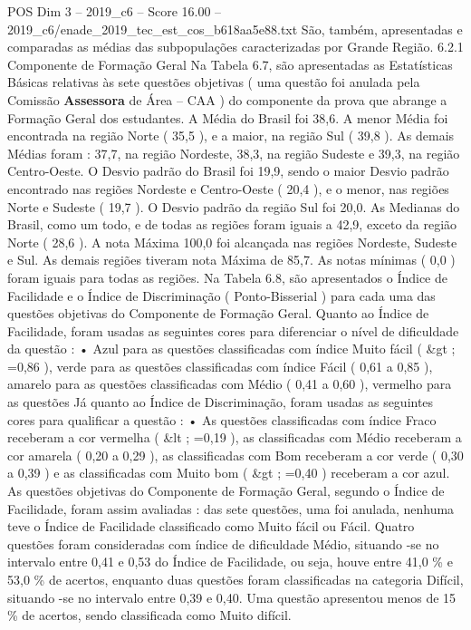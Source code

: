 \begin{textsample}{POS Dim 3 – 2019\_c6 – Score 16.00 – 2019\_c6/enade\_2019\_tec\_est\_cos\_b618aa5e88.txt}
São, também, apresentadas e comparadas as médias das subpopulações caracterizadas por Grande Região. 6.2.1 Componente de Formação Geral Na Tabela 6.7, são apresentadas as Estatísticas Básicas relativas às sete questões objetivas ( uma questão foi anulada pela Comissão \textbf{Assessora} de Área – CAA ) do componente da prova que abrange a Formação Geral dos estudantes.
A Média do Brasil foi 38,6.
A menor Média foi encontrada na região Norte ( 35,5 ), e a maior, na região Sul ( 39,8 ).
As demais Médias foram : 37,7, na região Nordeste, 38,3, na região Sudeste e 39,3, na região Centro-Oeste.
O Desvio padrão do Brasil foi 19,9, sendo o maior Desvio padrão encontrado nas regiões Nordeste e Centro-Oeste ( 20,4 ), e o menor, nas regiões Norte e Sudeste ( 19,7 ).
O Desvio padrão da região Sul foi 20,0.
As Medianas do Brasil, como um todo, e de todas as regiões foram iguais a 42,9, exceto da região Norte ( 28,6 ).
A nota Máxima 100,0 foi alcançada nas regiões Nordeste, Sudeste e Sul.
As demais regiões tiveram nota Máxima de 85,7.
As notas mínimas ( 0,0 ) foram iguais para todas as regiões.
Na Tabela 6.8, são apresentados o Índice de Facilidade e o Índice de Discriminação ( Ponto-Bisserial ) para cada uma das questões objetivas do Componente de Formação Geral.
Quanto ao Índice de Facilidade, foram usadas as seguintes cores para diferenciar o nível de dificuldade da questão : • Azul para as questões classificadas com índice Muito fácil ( \&gt ; =0,86 ), verde para as questões classificadas com índice Fácil ( 0,61 a 0,85 ), amarelo para as questões classificadas com Médio ( 0,41 a 0,60 ), vermelho para as questões Já quanto ao Índice de Discriminação, foram usadas as seguintes cores para qualificar a questão : • As questões classificadas com índice Fraco receberam a cor vermelha ( \&lt ; =0,19 ), as classificadas com Médio receberam a cor amarela ( 0,20 a 0,29 ), as classificadas com Bom receberam a cor verde ( 0,30 a 0,39 ) e as classificadas com Muito bom ( \&gt ; =0,40 ) receberam a cor azul.
As questões objetivas do Componente de Formação Geral, segundo o Índice de Facilidade, foram assim avaliadas : das sete questões, uma foi anulada, nenhuma teve o Índice de Facilidade classificado como Muito fácil ou Fácil.
Quatro questões foram consideradas com índice de dificuldade Médio, situando -se no intervalo entre 0,41 e 0,53 do Índice de Facilidade, ou seja, houve entre 41,0 \% e 53,0 \% de acertos, enquanto duas questões foram classificadas na categoria Difícil, situando -se no intervalo entre 0,39 e 0,40.
Uma questão apresentou menos de 15 \% de acertos, sendo classificada como Muito difícil.

\end{textsample}
